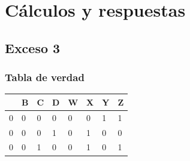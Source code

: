 \section{Cálculos y respuestas}
\subsection{Exceso 3}
\subsubsection{Tabla de verdad}

\begin{center}
\begin{tabular}{|llll|llll|}
\hline
\rowcolor[HTML]{FFCE93} 
\multicolumn{1}{|c}{\cellcolor[HTML]{FFCE93}\textbf{A}} & \multicolumn{1}{c}{\cellcolor[HTML]{FFCE93}\textbf{B}} & \multicolumn{1}{c}{\cellcolor[HTML]{FFCE93}\textbf{C}} & \multicolumn{1}{c|}{\cellcolor[HTML]{FFCE93}\textbf{D}} & \multicolumn{1}{c}{\cellcolor[HTML]{FFCE93}\textbf{W}} & \multicolumn{1}{c}{\cellcolor[HTML]{FFCE93}\textbf{X}} & \multicolumn{1}{c}{\cellcolor[HTML]{FFCE93}\textbf{Y}} & \multicolumn{1}{c|}{\cellcolor[HTML]{FFCE93}\textbf{Z}} \\ \hline
0                                                       & 0                                                      & 0                                                      & 0                                                       & 0                                                      & 0                                                      & 1                                                      & 1                                                       \\
0                                                       & 0                                                      & 0                                                      & 1                                                       & 0                                                      & 1                                                      & 0                                                      & 0                                                       \\
0                                                       & 0                                                      & 1                                                      & 0                                                       & 0                                                      & 1                                                      & 0                                                      & 1                                                       \\

\end{tabular}
\end{center}
